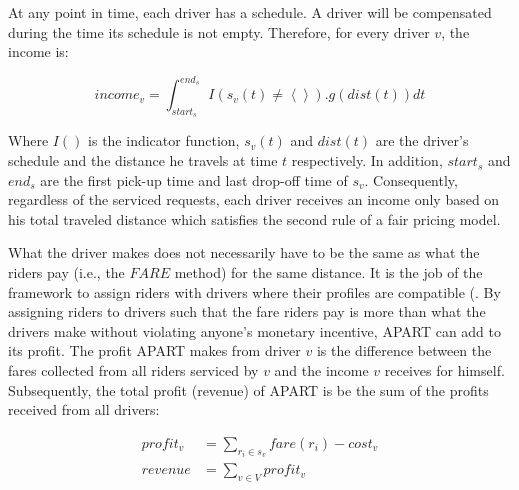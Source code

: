 At any point in time, each driver has a schedule. A driver will be compensated during the time its schedule is not empty. Therefore, for every driver $v$, the income is:

\begin{equation}
\label{eq:payment}
income_v = \int_{start_s}^{end_s} I\left( s_v(t) \neq \left\langle \right\rangle\right).g(dist(t))dt
\end{equation}

\noindent Where $I()$ is the indicator function, $s_v(t)$ and $dist(t)$ are the driver's schedule and the distance he travels at time $t$ respectively. In addition, $start_s$ and $end_s$ are the first pick-up time and last drop-off time of $s_v$. Consequently, regardless of the serviced requests, each driver receives an income only based on his total traveled distance which satisfies the second rule of a fair pricing model.

What the driver makes does not necessarily have to be the same as what the riders pay (i.e., the $FARE$ method) for the same distance. It is the job of the framework to assign riders with drivers where their profiles are compatible (. By assigning riders to drivers such that the fare riders pay is more than what the drivers make without violating anyone's monetary incentive, APART can add to its profit. The profit APART makes from driver $v$ is the difference between the fares collected from all riders serviced by $v$ and the income $v$ receives for himself. Subsequently, the total profit (revenue) of APART is be the sum of the profits received from all drivers:

\begin{align}
\label{eq:profit} 
profit_v &= \sum_{r_i \in s_v}fare(r_i) - cost_v\\
revenue &= \sum_{v \in V}profit_v
\end{align}

